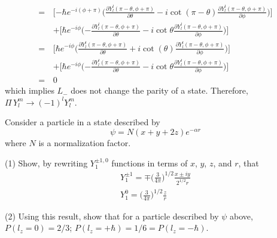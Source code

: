 \documentclass[../principles-of-quantum-mechanics.tex]{subfiles}
\begin{document}
\begin{questions}
\begin{solution}
\begin{align*}
				=\,&\Big[{-\hbar e^{-i(\phi  + \pi)}}\Big({\frac{\partial Y_l^l(\pi - \theta, \phi + \pi)}{\partial \theta}} - i\cot(\pi -\theta)\frac{\partial Y_l^l(\pi - \theta, \phi + \pi)}{\partial \phi}\Big)\Big] \\
				&+ \Big[{\hbar e^{-i\phi}}\Big({-\frac{\partial Y_l^l(\pi - \theta, \phi + \pi)}{\partial\theta}} - i\cot\theta\frac{\partial Y_l^l(\pi - \theta, \phi + \pi)}{\partial\phi}\Big)\Big] \\
				=\,&\Big[{\hbar e^{-i\phi}}\Big({\frac{\partial Y_l^l(\pi - \theta, \phi + \pi)}{\partial \theta}} + i\cot(\theta)\frac{\partial Y_l^l(\pi - \theta, \phi + \pi)}{\partial \phi}\Big)\Big] \\
				&+ \Big[{\hbar e^{-i\phi}}\Big({-\frac{\partial Y_l^l(\pi - \theta, \phi + \pi)}{\partial\theta}} - i\cot\theta\frac{\partial Y_l^l(\pi - \theta, \phi + \pi)}{\partial\phi}\Big)\Big] \\
				=\,&0
			\end{align*}
			which implies $L_-$ does not change the parity of a state. Therefore, $\Pi\,Y_l^m \to (-1)^l Y_l^m$.
		\end{solution}
		
		\question Consider a particle in a state described by
		$$\psi = N(x + y + 2z)e^{-\alpha r}$$
		where $N$ is a normalization factor.
		
		(1) Show, by rewriting $Y_1^{\pm 1, 0}$ functions in terms of $x$, $y$, $z$, and $r$, that
		\begin{gather*}
			Y_1^{\pm 1} = \mp\Big(\frac{3}{4\pi}\Big)^{1/2}\frac{x\pm iy}{2^{1/2}r} \\
			Y_1^0 = \Big(\frac{3}{4\pi}\Big)^{1/2}\frac{z}{r}
		\end{gather*}
	
		(2) Using this result, show that for a particle described by $\psi$ above, $P(l_z = 0) = 2/3$; $P(l_z = +\hbar) = 1/6 = P(l_z=-\hbar)$.
		

\end{questions}
\end{document}
